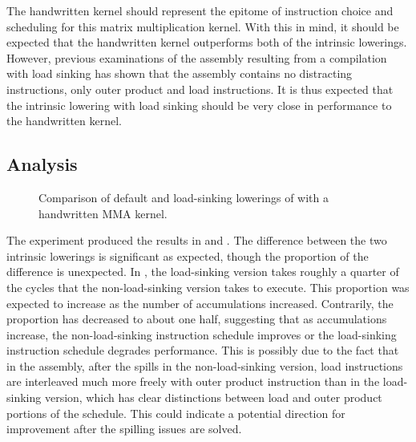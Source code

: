 \documentclass[\main/thesis.tex]{subfiles}
\begin{document}
The handwritten kernel should represent the epitome of instruction choice and scheduling for this matrix multiplication kernel.
With this in mind, it should be expected that the handwritten kernel outperforms both of the intrinsic lowerings.
However, previous examinations of the assembly resulting from a compilation with load sinking has shown that the assembly contains no distracting instructions, only outer product and load instructions.
It is thus expected that the intrinsic lowering with load sinking should be very close in performance to the handwritten kernel.

\subsection{Analysis}
\label{sec:intrHandAnalysis}
\begin{figure}[t]
  \centering
  
  \caption{Comparison of default and load-sinking lowerings of  with a handwritten MMA kernel.}
  \label{fig:intrHand}
\end{figure}
\begin{table}[t]
  \centering
  \caption{
    Comparison of default and load-sinking lowerings of  with a handwritten MMA kernel.
    See  for graphical presentation.
  }
  \label{tab:intrHand}
\end{table}

The experiment produced the results in  and .
The difference between the two intrinsic lowerings is significant as expected, though the proportion of the difference is unexpected.
In , the load-sinking version takes roughly a quarter of the cycles that the non-load-sinking version takes to execute.
This proportion was expected to increase as the number of accumulations increased.
Contrarily, the proportion has decreased to about one half, suggesting that as accumulations increase, the non-load-sinking instruction schedule improves or the load-sinking instruction schedule degrades performance.
This is possibly due to the fact that in the assembly, after the spills in the non-load-sinking version, load instructions are interleaved much more freely with outer product instruction than in the load-sinking version, which has clear distinctions between load and outer product portions of the schedule.
This could indicate a potential direction for improvement after the spilling issues are solved.
\end{document}
